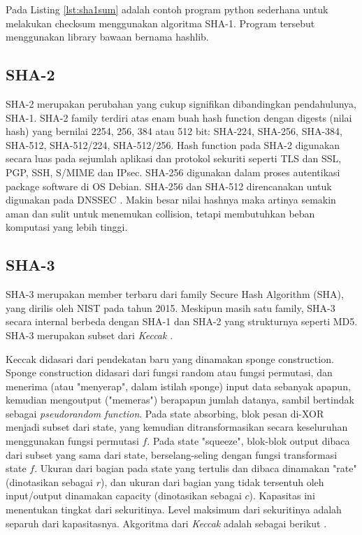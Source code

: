 

Pada Listing \ref{lst:sha1sum} adalah contoh program python sederhana untuk melakukan checksum menggunakan algoritma SHA-1. Program tersebut menggunakan library bawaan bernama hashlib.

\subsection{SHA-2}
\label{subsec:SHA2}

SHA-2 merupakan perubahan yang cukup signifikan dibandingkan pendahulunya, SHA-1. SHA-2 family terdiri atas enam buah hash function dengan digests (nilai hash) yang bernilai 2254, 256, 384 atau 512 bit: SHA-224, SHA-256, SHA-384, SHA-512, SHA-512/224, SHA-512/256. Hash function pada SHA-2 digunakan secara luas pada sejumlah aplikasi dan protokol sekuriti seperti TLS dan SSL, PGP, SSH, S/MIME dan IPsec. SHA-256 digunakan dalam proses autentikasi package software di OS Debian. SHA-256 dan SHA-512 direncanakan untuk digunakan pada DNSSEC \citep{rfc5702}. Makin besar nilai hashnya maka artinya semakin aman dan sulit untuk menemukan collision, tetapi membutuhkan beban komputasi yang lebih tinggi.

\subsection{SHA-3}
\label{subsec:SHA3}

SHA-3 merupakan member terbaru dari family Secure Hash Algorithm (SHA), yang dirilis oleh NIST pada tahun 2015. Meskipun masih satu family, SHA-3 secara internal berbeda dengan SHA-1 dan SHA-2 yang strukturnya seperti MD5. SHA-3 merupakan subset dari \emph{Keccak} \citep{nist2012}. 

Keccak didasari dari pendekatan baru yang dinamakan sponge construction. Sponge construction didasari dari fungsi random atau fungsi permutasi, dan menerima (atau "menyerap", dalam istilah sponge) input data sebanyak apapun, kemudian mengoutput ("memeras") berapapun jumlah datanya, sambil bertindak sebagai \emph{pseudorandom function}. Pada state absorbing, blok pesan di-XOR menjadi subset dari state, yang kemudian ditransformasikan secara keseluruhan menggunakan fungsi permutasi \(f\). Pada state "squeeze", blok-blok output dibaca dari subset yang sama dari state, berselang-seling dengan fungsi transformasi state \(f\). Ukuran dari bagian pada state yang tertulis dan dibaca dinamakan "rate" (dinotasikan sebagai \(r\)), dan ukuran dari bagian yang tidak tersentuh oleh input/output dinamakan capacity (dinotasikan sebagai \(c\)). Kapasitas ini menentukan tingkat dari sekuritinya. Level maksimum dari sekuritinya adalah separuh dari kapasitasnya. Akgoritma dari \emph{Keccak} adalah sebagai berikut \citep{arshad2014}.

